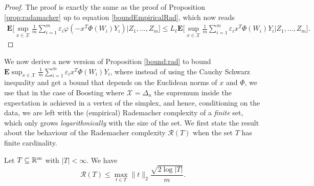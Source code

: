 \begin{proof}
The proof is exactly the same as the proof of Proposition \ref{prop:radamacher} up to equation \eqref{boundEmpiricalRad}, which now reads
\begin{align*}
	\mathbf{E} \bigg[ \sup_{x\in\mathcal{X}} \frac{1}{m}\sum_{i=1}^m\varepsilon_i \varphi(-x^T\Phi(W_i)Y_i) \bigg| Z_1,\ldots,Z_m \bigg]
	\le
	L_\ell\mathbf{E} \bigg[ \sup_{x\in\mathcal{X}} \frac{1}{m}\sum_{i=1}^m\varepsilon_i x^T\Phi(W_i)Y_i \bigg| Z_1,\ldots,Z_m \bigg].
\end{align*}
\end{proof}

We now derive a new version of Proposition \ref{bound:rad} to bound $\mathbf{E} \sup_{x\in\mathcal{X}} \frac{1}{m}\sum_{i=1}^m\varepsilon_i x^T\Phi(W_i)Y_i$, where instead of using the Cauchy Schwarz inequality and get a bound that depends on the Euclidean norms of $x$ and $\Phi$, we use that in the case of Boosting where $\mathcal{X}=\Delta_n$ the supremum inside the expectation is achieved in a vertex of the simplex, and hence, conditioning on the data, we are left with the (empirical) Rademacher complexity of a \emph{finite} set, which only grows \emph{logarithmically} with the size of the set. We first state the result about the behaviour of the Rademacher complexity $\mathcal{R}(T)$ when the set $T$ has finite cardinality.

\begin{lemma}
\label{lem:RadFiniteSet}
Let $T\subseteq\mathbb{R}^m$ with $|T|<\infty$. We have
$$
	\mathcal{R}(T) \le \max_{t\in T} \| t \|_2 \frac{\sqrt{2\log |T|}}{m}.
$$
\end{lemma}


